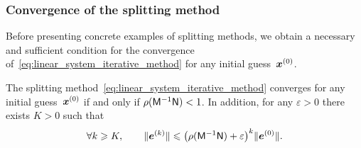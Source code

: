 \subsubsection{Convergence of the splitting method}%
\label{ssub:convergence_of_the_basic_splitting_method}
Before presenting concrete examples of splitting methods,
we obtain a necessary and sufficient condition for the convergence of~\eqref{eq:linear_system_iterative_method}
for any initial guess~$\mathbf{\boldsymbol{x}}^{(0)}$.

\begin{proposition}
    [Convergence]
    \label{proposition:linear_convergence}
    The splitting method~\eqref{eq:linear_system_iterative_method} converges for any initial guess~$\mathbf{\boldsymbol{x}}^{(0)}$
    if and only if $\rho(\mathsf M^{-1} \mathsf N) < 1$.
    In addition, for any $\varepsilon > 0$ there exists $K > 0$ such that
    \begin{equation}
        \label{eq:additional_claim}
        \forall k \geqslant K,
        \qquad
        \lVert\mathbf{\boldsymbol{e}}^{(k)}\rVert \leqslant \bigl(\rho(\mathsf M^{-1} \mathsf N) + \varepsilon\bigr)^k \lVert\mathbf{\boldsymbol{e}}^{(0)}\rVert.
    \end{equation}
\end{proposition}
